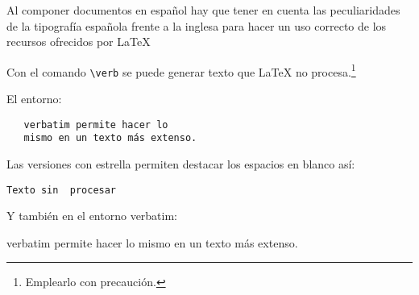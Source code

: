 \documentclass[11pt,a4paper]{article}
\begin{document}
Al componer documentos en español hay que tener en cuenta las peculiaridades de la tipografía española frente a la inglesa para hacer un uso correcto de los recursos ofrecidos por \LaTeX

\noindent Con el comando \verb+\verb+ se puede generar texto que \LaTeX{} no procesa.\footnote{Emplearlo con precaución.}



El entorno:
\begin{verbatim}
   verbatim permite hacer lo 
   mismo en un texto más extenso.
\end{verbatim} 

Las versiones con estrella permiten destacar los espacios en blanco así:

\verb*|Texto sin  procesar|

Y también en el entorno verbatim:

\begin{verbatim*}
   verbatim permite hacer lo 
   mismo en un texto más extenso.
\end{verbatim*} 
\end{document}
